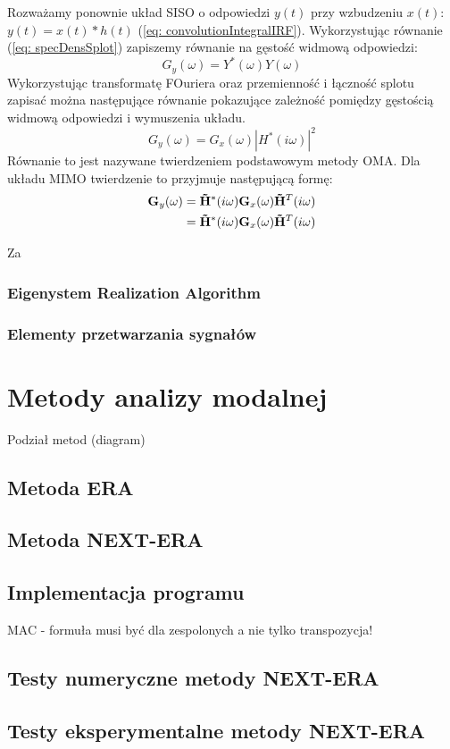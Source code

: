 Rozważamy ponownie układ SISO o odpowiedzi $y(t)$ przy wzbudzeniu $x(t)$: $y(t)=x(t)*h(t)$ (\ref{eq: convolutionIntegralIRF}). Wykorzystując równanie (\ref{eq: specDensSplot}) zapiszemy równanie na gęstość widmową odpowiedzi:
\begin{equation} \label{g}
	G_{y}(\omega) = Y^*(\omega)Y(\omega)
\end{equation}
Wykorzystując transformatę FOuriera oraz przemienność i łączność splotu zapisać można następujące równanie pokazujące zależność pomiędzy gęstością widmową odpowiedzi i wymuszenia układu.
\begin{equation}
	G_{y}(\omega) = G_x(\omega)|H^*(i\omega)|^2
\end{equation}
Równanie to jest nazywane twierdzeniem podstawowym  metody OMA. Dla układu MIMO twierdzenie to przyjmuje następującą formę:
\begin{equation}
	\begin{split}
	\mathbf{G}_{y}(\omega) &=\mathbf{\tilde{H}}^*(i\omega)\mathbf{G}_x(\omega)\mathbf{\tilde{H}}^T(i\omega)\\
	&=\mathbf{\tilde{H}}^*(i\omega)\mathbf{G}_x(\omega)\mathbf{\tilde{H}}^T(i\omega)
	\end{split}
\end{equation}

Za










\subsection{Eigenystem Realization Algorithm}

\subsection{Elementy przetwarzania sygnałów}


	\chapter{Metody analizy modalnej}

	Podział metod (diagram)
	\section{Metoda ERA}
	\section{Metoda NEXT-ERA}
	\section{Implementacja programu}
MAC - \parencite{allemang_modal_2003} formuła musi być dla zespolonych a nie tylko transpozycja!
\section{Testy numeryczne metody NEXT-ERA}
\section{Testy eksperymentalne metody NEXT-ERA}
